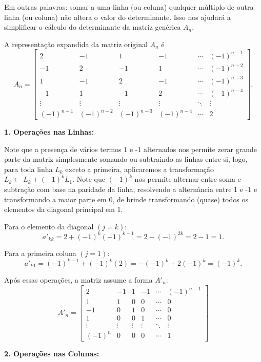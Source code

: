 \documentclass{hipatia}
\begin{document}
Em outras palavras: somar a uma linha (ou coluna) qualquer múltiplo de outra linha (ou coluna) não altera o valor do determinante. Isso nos ajudará a simplificar o cálculo do determinante da matriz genérica $A_n$.

A representação expandida da matriz original $A_n$ é
{\footnotesize$$A_n = \begin{bmatrix}
2 & -1 & 1 & -1 & \cdots & (-1)^{n-1} \\
-1 & 2 & -1 & 1 & \cdots & (-1)^{n-2} \\
1 & -1 & 2 & -1 & \cdots & (-1)^{n-3} \\
-1 & 1 & -1 & 2 & \cdots & (-1)^{n-4} \\
\vdots & \vdots & \vdots & \vdots & \ddots & \vdots \\
(-1)^{n-1} & (-1)^{n-2} & (-1)^{n-3} & (-1)^{n-4} & \cdots & 2
\end{bmatrix}.$$}

\textbf{1. Operações nas Linhas:}

Note que a presença de vários termos 1 e -1 alternados nos permite zerar grande parte da matriz simplesmente somando ou subtraindo as linhas entre si, logo, para toda linha $L_k$ exceto a primeira, aplicaremos a transformação $L_k \leftarrow L_k + (-1)^k L_1$. Note que $(-1)^k$ nos permite alternar entre soma e subtração com base na paridade da linha, resolvendo a alternância entre 1 e -1 e transformando a maior parte em 0, de brinde transformando (quase) todos os elementos da diagonal principal em 1.

Para o elemento da diagonal $(j=k)$:
$$a'_{kk} = 2 + (-1)^k(-1)^{k-1} = 2 - (-1)^{2k} = 2 - 1 = 1.$$

Para a primeira coluna $(j=1)$:
$$a'_{k1} = (-1)^{k-1} + (-1)^k(2) = -(-1)^k + 2(-1)^k = (-1)^k.$$

Após essas operações, a matriz assume a forma $A'_n$:
$$A'_n = \begin{bmatrix}
2 & -1 & 1 & -1 & \cdots & (-1)^{n-1} \\
1 & 1 & 0 & 0 & \cdots & 0 \\
-1 & 0 & 1 & 0 & \cdots & 0 \\
1 & 0 & 0 & 1 & \cdots & 0 \\
\vdots & \vdots & \vdots & \vdots & \ddots & \vdots \\
(-1)^{n} & 0 & 0 & 0 & \cdots & 1
\end{bmatrix}$$

\textbf{2. Operações nas Colunas:}
\end{document}
